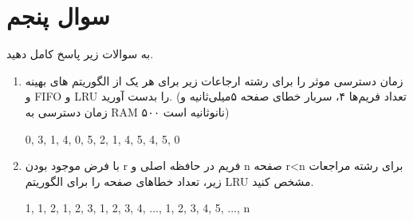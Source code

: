 \section{سوال پنجم}

به سوالات زیر پاسخ کامل دهید.

\begin{enumerate}
	\item زمان دسترسی موثر را برای رشته ارجاعات زیر برای هر یک از الگوریتم های بهینه و FIFO و LRU را بدست آورید. (تعداد فریم‌ها ۴، سربار خطای صفحه ۵میلی‌ثانیه و زمان دسترسی به RAM ۵۰۰ نانو‌ثانیه است)
	
	\begin{latin}
	0, 3, 1, 4, 0, 5, 2, 1, 4, 5, 4, 5, 0
	\end{latin}
	
	\item با فرض موجود بودن r فریم در حافظه اصلی و n صفحه r<n برای رشته مراجعات زیر، تعداد خطا‌های صفحه را برای الگوریتم LRU مشخص کنید.
	
	\begin{latin}
		1, 1, 2, 1, 2, 3, 1, 2, 3, 4, ..., 1, 2, 3, 4, 5, ..., n 
	\end{latin}
	
\end{enumerate}


